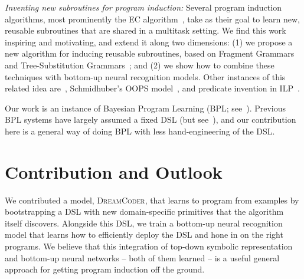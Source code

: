 \documentclass{article}
\newcommand{\systemEnding}{\textsc{DreamCoder}}
\begin{document}
 \noindent \emph{Inventing new subroutines for program induction:}
 Several program induction algorithms, most prominently the EC algorithm~\cite{Dechter:2013:BLV:2540128.2540316}, take as their goal to learn new, reusable subroutines that are shared in a multitask setting. We find this work inspiring and motivating,
 and extend it along two dimensions: (1) we propose a new algorithm for
 inducing reusable subroutines, based on Fragment Grammars~\cite{tim} and Tree-Substitution Grammars~\cite{cohn2010inducing};
 and (2) we show how to combine these techniques with bottom-up neural recognition models.
 Other instances of this related idea are~\cite{DBLP:conf/icml/LiangJK10}, Schmidhuber's OOPS model~\cite{schmidhuber2004optimal}, and predicate invention in ILP~\cite{DBLP:conf/ecai/LinDETM14}.
 
 Our work is an instance of
 Bayesian Program
 Learning (BPL; see~\citep{lake2013one,Dechter:2013:BLV:2540128.2540316,ellis2016sampling,DBLP:conf/icml/LiangJK10}). Previous BPL systems have largely assumed a fixed DSL (but see~\cite{DBLP:conf/icml/LiangJK10}),
 and our contribution here is a general way of doing BPL with less hand-engineering of the DSL.
 
 \section{Contribution and Outlook}
 We contributed a model, \systemEnding, that learns to program from examples by
 bootstrapping a DSL with new domain-specific primitives that the algorithm itself discovers.
  Alongside this DSL, we train a bottom-up
 neural recognition model that learns how to efficiently deploy the
 DSL and hone in on the right programs.  We believe that this
 integration of top-down symbolic representation and bottom-up neural
 networks -- both of them learned -- is a useful general approach for
 getting program induction off the ground. 
  






\end{document}
